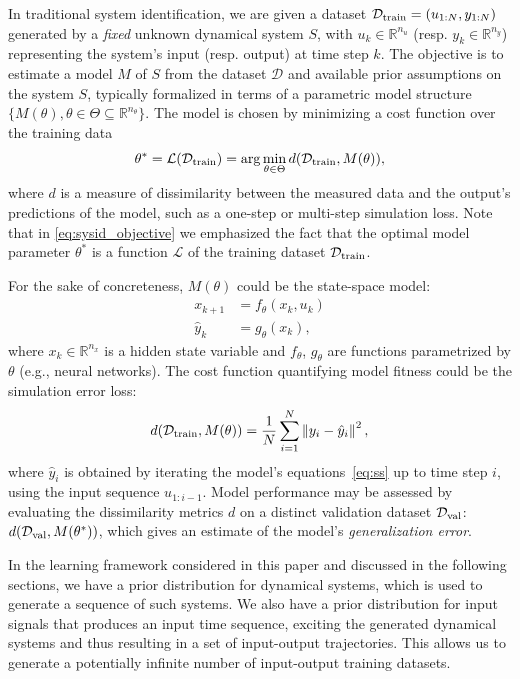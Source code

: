 \documentclass{article}
\newcommand{\sys}{S}
\newcommand{\diss}{d}
\newcommand{\learn}{\mathcal{L}}
\newcommand{\D}{\mathcal{D}}
\newcommand{\R}{\mathbb{R}}
\newcommand{\nsamp}{N}
\newcommand{\norm}[1]{\left\lVert#1\right\rVert}
\begin{document}
In traditional  system identification, we are given a dataset $\D_{\rm train} = (u_{1:\nsamp}, y_{1:\nsamp})$ 
generated by a \emph{fixed} unknown dynamical system $\sys$, with $u_k \in \mathbb{R}^{n_u}$ (resp. $y_k  \in \mathbb{R}^{n_y}$) representing the system's input (resp. output) at time step $k$. The objective is to estimate a model $M$ of $\sys$ from the dataset $\D$ and available prior assumptions on the system $\sys$, typically formalized in terms of a parametric model structure $\{M(\theta), \theta \in \Theta \subseteq \mathbb{R}^{n_\theta} \}$.
% 
The model is chosen by minimizing a cost function over the training data
\begin{equation}
\label{eq:sysid_objective}
\theta^* = \learn({\D_{\rm train}}) = \arg \min_{\theta \in \Theta} \diss(\D_{\rm train}, M(\theta)),
\end{equation}
where $\diss$ is a measure of dissimilarity between the measured data and the output's predictions of the model, such as a one-step or multi-step simulation loss. Note that in \eqref{eq:sysid_objective} we emphasized the fact that the optimal model parameter $\theta^*$ is a function $ \learn$ of the training dataset $\D_{\rm train}$.

For the sake of concreteness, $M(\theta)$ could be the 
state-space model:
\begin{subequations}
\label{eq:ss}
\begin{align}
x_{k + 1} &= f_\theta(x_k, u_k)\\
\hat y_k &= g_\theta(x_k),
\end{align}
\end{subequations}
where $x_k \in \R^{n_x}$ is a hidden state variable and $f_{\theta}$, $g_{\theta}$ are functions parametrized by  $\theta$ (e.g., neural networks). The cost function quantifying model fitness could be 
the simulation error loss:
\begin{equation}
\diss(\D_{\rm train}, M(\theta)) = \frac{1}{\nsamp} \sum_{i=1}^{\nsamp} \norm{y_i- \hat y_{i}}^2, %
\end{equation}
where $\hat y_{i}$ is obtained by iterating the model's equations~\eqref{eq:ss} up to time step $i$, using the input sequence $u_{1:i-1}$.
Model performance may be assessed by evaluating the dissimilarity metrics $\diss$
on a distinct validation dataset $\D_{\rm val}$:
$\diss(\D_{\rm val}, M(\theta^*))$, which  gives an   estimate of the model's \emph{generalization error}.


In the learning framework considered in this paper and discussed in the following sections, we have a prior distribution for dynamical systems, which is used to generate a sequence of such systems. We also have a prior distribution for input signals that produces an input time sequence, exciting the generated dynamical systems and thus resulting in a set of input-output trajectories. This allows us to generate a potentially infinite number of input-output training datasets. 
\end{document}

